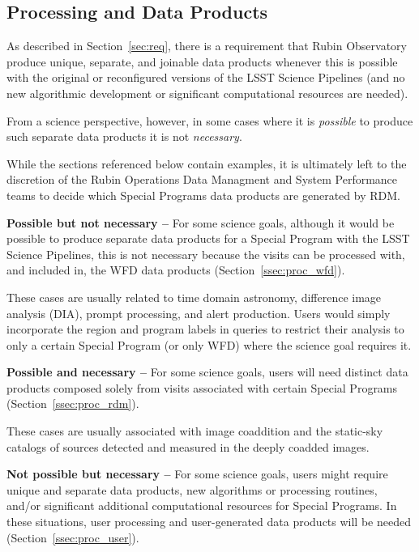 \subsection{Processing and Data Products}

As described in Section~\ref{sec:req}, there is a requirement that 
Rubin Observatory produce unique, separate, and joinable data products 
whenever this is possible with the original or reconfigured versions of the 
LSST Science Pipelines (and no new algorithmic development or significant 
computational resources are needed).

From a science perspective, however, in some cases where it is \emph{possible} 
to produce such separate data products it is not \emph{necessary}.

While the sections referenced below contain examples, it is ultimately left to 
the discretion of the Rubin Operations Data Managment and System Performance teams 
to decide which Special Programs data products are generated by RDM.

\textbf{Possible but not necessary -- } 
For some science goals, although it would be possible to produce separate 
data products for a Special Program with the LSST Science Pipelines, this 
is not necessary because the visits can be processed with, and included in, 
the WFD data products (Section~\ref{ssec:proc_wfd}).

These cases are usually related to time domain astronomy, difference image
analysis (DIA), prompt processing, and alert production.
Users would simply incorporate the region and program labels in queries to restrict 
their analysis to only a certain Special Program (or only WFD) where the 
science goal requires it.

\textbf{Possible and necessary -- }
For some science goals, users will need distinct data products composed solely from visits associated with certain Special Programs (Section~\ref{ssec:proc_rdm}).

These cases are usually associated with image coaddition and the static-sky catalogs 
of sources detected and measured in the deeply coadded images. 

\textbf{Not possible but necessary -- }
For some science goals, users might require unique and separate data products, 
new algorithms or processing routines, and/or significant additional 
computational resources for Special Programs.
In these situations, user processing and user-generated data products will be 
needed (Section~\ref{ssec:proc_user}).


